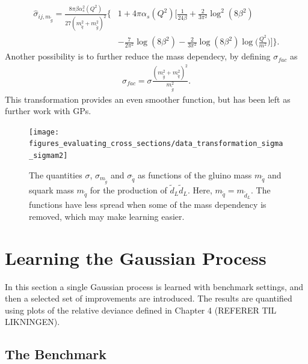 \documentclass[twoside,english]{uiofysmaster}
\begin{document}
\begin{align}
\hat{\sigma}_{ij, m_{\tilde{g}}} =  \frac{8 \pi \beta \alpha^2_s (Q^2)}{27(m_{\tilde{q}}^2 + m_{\tilde{g}}^2)^2} \Bigg\{&1 
 + 4 \pi \alpha_s (Q^2) \Bigg[ \frac{1}{24 \beta} 
 + \frac{2}{3 \pi^2} \log^2(8 \beta^2)\\& - \frac{7}{2 \pi^2} \log (8 \beta^2)
- \frac{2}{3 \pi^2} \log (8 \beta^2) \log \Big( \frac{Q^2}{m^2} \Big) \Bigg] \Bigg\}.
\end{align}
Another possibility is to further reduce the mass dependecy, by defining $\sigma_{fac}$ as 
\begin{align}
\sigma_{fac} = \sigma \frac{(m_{\tilde{g}}^2 + m_{\tilde{q}}^2)^2}{m_{\tilde{g}}^2}.
\end{align}
This transformation provides an even smoother function, but has been left as further work with GPs.

\begin{figure}
\centering
\texttt{[image: figures\_evaluating\_cross\_sections/data\_transformation\_sigma\_sigmam2]}
\caption{The quantities $\sigma$, $\sigma_{m_{\tilde{g}}}$ and $\sigma_{\tilde{q}}$ as functions of the gluino mass $m_{\tilde{q}}$ and squark mass $m_{\tilde{q}}$ for the production of $\tilde{d}_L \tilde{d}_L$. Here, $m_{\tilde{q}} = m_{\tilde{d}_L}$. The functions have less spread when some of the mass dependency is removed, which may make learning easier.}
\label{Fig:: evaluating cross : Comparison sigma and sigma/m}
\end{figure}

\section{Learning the Gaussian Process}

In this section a single Gaussian process is learned with benchmark settings, and then a selected set of improvements are introduced. The results are quantified using plots of the relative deviance defined in Chapter 4 (REFERER TIL LIKNINGEN).

\subsection{The Benchmark}
\end{document}
